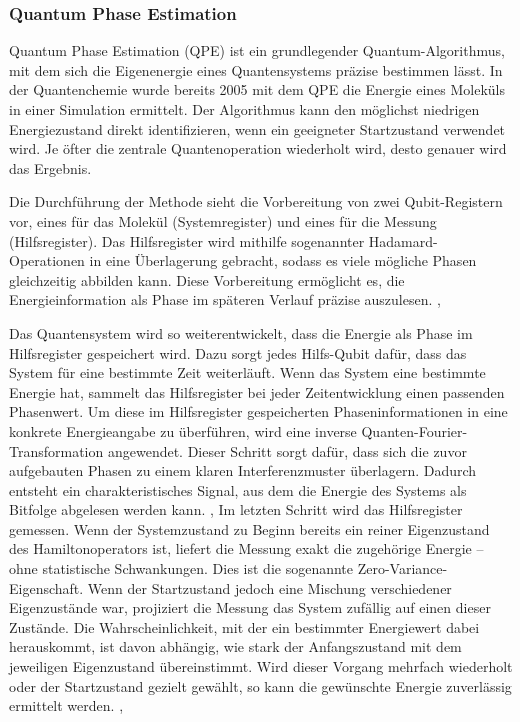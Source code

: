 \subsubsection*{Quantum Phase Estimation}

Quantum Phase Estimation (QPE) ist ein grundlegender Quantum-Algorithmus, mit dem sich die Eigenenergie eines Quantensystems präzise bestimmen lässt. In der Quantenchemie wurde bereits 2005 mit dem QPE die Energie eines Moleküls in einer Simulation ermittelt. \citealp[5]{weidmanQuantumComputingChemistry2024a} Der Algorithmus kann den möglichst niedrigen Energiezustand direkt identifizieren, wenn ein geeigneter Startzustand verwendet wird. Je öfter die zentrale Quantenoperation wiederholt wird, desto genauer wird das Ergebnis.

Die Durchführung der Methode sieht die Vorbereitung von zwei Qubit-Registern vor, eines für das Molekül (Systemregister) und eines für die Messung (Hilfsregister). Das Hilfsregister wird mithilfe sogenannter Hadamard-Operationen in eine Überlagerung gebracht, sodass es viele mögliche Phasen gleichzeitig abbilden kann. Diese Vorbereitung ermöglicht es, die Energieinformation als Phase im späteren Verlauf präzise auszulesen. \citealp[25]{weidmanQuantumComputingChemistry2024a}, \citealp[29]{mottaEmergingQuantumComputing2022} 

Das Quantensystem wird so weiterentwickelt, dass die Energie als Phase im Hilfsregister gespeichert wird. Dazu sorgt jedes Hilfs-Qubit dafür, dass das System für eine bestimmte Zeit weiterläuft. Wenn das System eine bestimmte Energie hat, sammelt das Hilfsregister bei jeder Zeitentwicklung einen passenden Phasenwert. Um diese im Hilfsregister gespeicherten Phaseninformationen in eine konkrete Energieangabe zu überführen, wird eine inverse Quanten-Fourier-Transformation angewendet. Dieser Schritt sorgt dafür, dass sich die zuvor aufgebauten Phasen zu einem klaren Interferenzmuster überlagern. Dadurch entsteht ein charakteristisches Signal, aus dem die Energie des Systems als Bitfolge abgelesen werden kann. \citealp[7]{vonburgQuantumComputingEnhanced2021}, \citealp[25]{mottaEmergingQuantumComputing2022} Im letzten Schritt wird das Hilfsregister gemessen. Wenn der Systemzustand zu Beginn bereits ein reiner Eigenzustand des Hamiltonoperators ist, liefert die Messung exakt die zugehörige Energie – ohne statistische Schwankungen. Dies ist die sogenannte Zero-Variance-Eigenschaft. Wenn der Startzustand jedoch eine Mischung verschiedener Eigenzustände war, projiziert die Messung das System zufällig auf einen dieser Zustände. Die Wahrscheinlichkeit, mit der ein bestimmter Energiewert dabei herauskommt, ist davon abhängig, wie stark der Anfangszustand mit dem jeweiligen Eigenzustand übereinstimmt. Wird dieser Vorgang mehrfach wiederholt oder der Startzustand gezielt gewählt, so kann die gewünschte Energie zuverlässig ermittelt werden. \citealp[7]{vonburgQuantumComputingEnhanced2021},\citealp[25]{mottaEmergingQuantumComputing2022}

